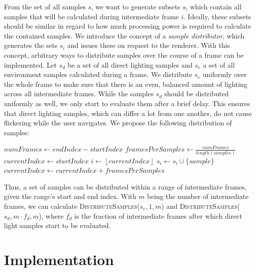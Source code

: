 \documentclass[sigconf,authorversion]{acmart}
\begin{document}
From the set of all samples $s$, we want to generate subsets $s_i$ which contain all samples that will be calculated during intermediate frame $i$.
Ideally, these subsets should be similar in regard to how much processing power is required to calculate the contained samples.
We introduce the concept of a \emph{sample distributor}, which generates the sets $s_i$ and issues these on request to the renderer.
With this concept, arbitrary ways to distribute samples over the course of a frame can be implemented. 
Let $s_d$ be a set of all direct lighting samples and $s_e$ a set of all environment samples calculated during a frame.
We distribute $s_e$ uniformly over the whole frame to make sure that there is an even, balanced amount of lighting across all intermediate frames.
While the samples $s_d$ should be distributed uniformly as well, we only start to evaluate them after a brief delay.
This ensures that direct lighting samples, which can differ a lot from one another, do not cause flickering while the user navigates.
We propose the following distribution of samples:
\begin{algorithm}[H]
\begin{algorithmic}
    \State $numFrames \gets endIndex - startIndex$
    \State $framesPerSamples \gets \frac{numFrames}{length(samples)}$
    \State $currentIndex \gets startIndex$
        \State $i \gets \left \lfloor{currentIndex}\right \rfloor$
        \State $s_i \gets s_i \cup \{ sample \}$
        \State $currentIndex \gets currentIndex + framesPerSamples$
    \EndFor
\EndFunction
\end{algorithmic}
\caption{Distribution of samples over the course of a frame.}
\end{algorithm}
\noindent
Thus, a set of samples can be distributed within a range of intermediate frames, given the range's start and end index.
With $m$ being the number of intermediate frames, we can calculate \textsc{DistributeSamples}($s_e, 1, m$) and \textsc{DistributeSamples}($s_d, m \cdot f_d, m$), where $f_d$ is the fraction of intermediate frames after which direct light samples start to be evaluated.

\section{Implementation}
\label{sec:implementation}
\end{document}
